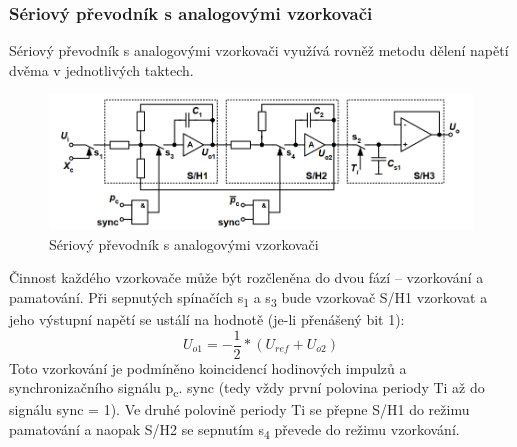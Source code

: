 \subsubsection{Sériový převodník s analogovými vzorkovači}
Sériový převodník s analogovými vzorkovači využívá rovněž metodu dělení napětí dvěma v jednotlivých taktech. 
\begin{figure}[h]
   \begin{center}
     \includegraphics[scale=0.6]{images/DA2.png}
   \end{center}
   \caption{Sériový převodník s analogovými vzorkovači}
\end{figure}
Činnost každého vzorkovače může být rozčleněna do dvou fází – vzorkování a pamatování. Při sepnutých spínačích s\textsubscript{1} a s\textsubscript{3} bude vzorkovač S/H1 vzorkovat a jeho výstupní napětí se ustálí na hodnotě (je-li přenášený bit 1):
\begin{equation}
U_{o1}=-\frac{1}{2}*(U_{ref}+U_{o2})
\end{equation}
Toto vzorkování je podmíněno koincidencí hodinových impulzů a synchronizačního signálu p\textsubscript{c}. sync (tedy vždy první polovina periody Ti až do signálu sync = 1). Ve druhé polovině periody Ti se přepne S/H1 do režimu pamatování a naopak S/H2 se sepnutím s\textsubscript{4} převede do režimu vzorkování.

